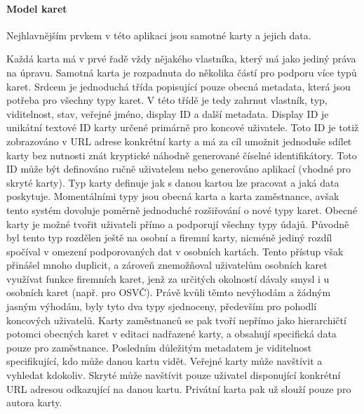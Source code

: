 
		\paragraph{Model karet}

		Nejhlavnějším prvkem v této aplikaci jsou samotné karty a jejich data.


		Každá karta má v prvé řadě vždy nějakého vlastníka, který má jako jediný práva na
		úpravu.
		Samotná karta je rozpadnuta do několika částí pro podporu více typů karet.
		Srdcem je jednoduchá třída popisující pouze obecná metadata, která jsou potřeba pro všechny typy karet.
		V této třídě je tedy zahrnut vlastník, typ, viditelnost, stav, veřejné jméno, display ID a další metadata.
		Display ID je unikátní textové ID karty určené primárně pro koncové uživatele.
		Toto ID je totiž zobrazováno v \ac{URL} adrese konkrétní karty a má za cíl umožnit jednoduše sdílet karty bez nutnosti
		znát kryptické náhodně generované číselné identifikátory.
		Toto ID může být definováno ručně uživatelem nebo generováno aplikací (vhodné pro skryté karty).
		Typ karty definuje jak s danou kartou lze pracovat a jaká data poskytuje.
		Momentálními typy jsou obecná karta a karta zaměstnance, avšak tento systém dovoluje poměrně jednoduché rozšiřování
		o nové typy karet.
		Obecné karty je možné tvořit uživateli přímo a podporují všechny typy údajů.
		Původně byl tento typ rozdělen ještě na osobní a firemní karty, nicméně jediný rozdíl spočíval v omezení podporovaných dat
		v osobních kartách.
		Tento přístup však přinášel mnoho duplicit, a zároveň znemožňoval uživatelům osobních karet využívat funkce
		firemních karet, jenž za určitých okolností dávaly smysl i u osobních karet (např. pro OSVČ).
		Právě kvůli těmto nevýhodám a žádným jasným výhodám, byly tyto dva typy sjednoceny, především pro pohodlí
		koncových uživatelů.
		Karty zaměstnanců se pak tvoří nepřímo jako hierarchičtí potomci obecných karet v editaci nadřazené karty, a
		obsahují specifická data pouze pro zaměstnance.
		Posledním důležitým metadatem je viditelnost specifikující, kdo může danou kartu vidět.
		Veřejné karty může navštívit a vyhledat kdokoliv.
		Skryté může navštívit pouze uživatel disponující konkrétní \ac{URL} adresou odkazující na danou kartu.
		Privátní karta pak už slouží pouze pro autora karty.

